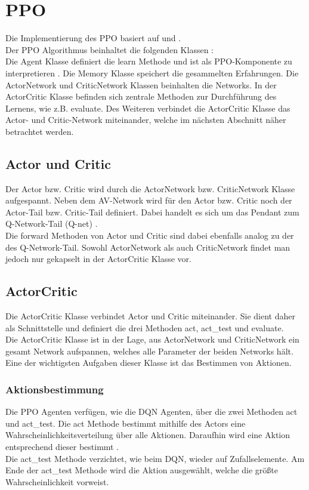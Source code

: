 \section{PPO} \label{sec:Implementierung_PPO}
Die Implementierung des PPO basiert auf \cite{pytorch_minimal_ppo} und \cite{Charles2013}.\\
Der PPO Algorithmus beinhaltet die folgenden Klassen :\\
Die Agent Klasse definiert die learn Methode und ist als PPO-Komponente zu interpretieren .
Die Memory Klasse speichert die gesammelten Erfahrungen.
Die ActorNetwork und CriticNetwork Klassen beinhalten die Networks.
In der ActorCritic Klasse befinden sich zentrale Methoden zur Durchführung des Lernens, wie z.B. evaluate. 
Des Weiteren verbindet die ActorCritic Klasse das Actor- und Critic-Network miteinander, welche im nächsten Abschnitt näher betrachtet werden.

\subsection{Actor und Critic} \label{subsec:Implementierung_Actor_und_Critic}
Der Actor bzw. Critic wird durch die ActorNetwork bzw. CriticNetwork Klasse aufgespannt.
Neben dem AV-Network wird für den Actor bzw. Critic noch der Actor-Tail bzw. Critic-Tail definiert. Dabei handelt es sich um das Pendant zum Q-Network-Tail (Q-net) .\\
Die forward Methoden von Actor und Critic sind dabei ebenfalls analog zu der des Q-Network-Tail. 
Sowohl ActorNetwork als auch CriticNetwork findet man jedoch nur gekapselt in der ActorCritic Klasse vor.

\subsection{ActorCritic} \label{subsec:Implementierung_ActorCritic}
Die ActorCritic Klasse verbindet Actor und Critic miteinander. Sie dient daher als Schnittstelle und definiert die drei Methoden act, act\_test und evaluate.\\
Die ActorCritic Klasse ist in der Lage, aus ActorNetwork und CriticNetwork ein gesamt Network aufspannen, welches alle Parameter der beiden Networks hält. Eine der wichtigsten Aufgaben dieser Klasse ist das Bestimmen von Aktionen.

\subsubsection{Aktionsbestimmung} \label{subsubsec:Implementierung_Aktionsbestimmung_PPO}
Die PPO Agenten verfügen, wie die DQN Agenten, über die zwei Methoden act und act\_test. Die act Methode bestimmt mithilfe des Actors eine Wahrscheinlichkeitsverteilung über alle Aktionen.
Daraufhin wird eine Aktion entsprechend dieser bestimmt .\\
Die act\_test Methode verzichtet, wie beim DQN, wieder auf Zufallselemente.
Am Ende der act\_test Methode wird die Aktion ausgewählt, welche die größte Wahrscheinlichkeit vorweist.

